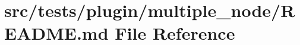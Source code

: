 \hypertarget{src_2tests_2plugin_2multiple__node_2README_8md}{}\section{src/tests/plugin/multiple\+\_\+node/\+R\+E\+A\+D\+ME.md File Reference}
\label{src_2tests_2plugin_2multiple__node_2README_8md}
